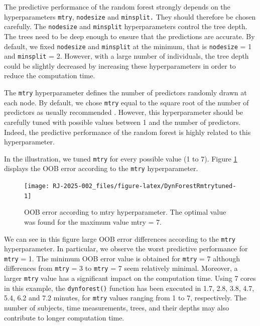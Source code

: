 The predictive performance of the random forest strongly depends on the hyperparameters \texttt{mtry}, \texttt{nodesize} and \texttt{minsplit.} They should therefore be chosen carefully. The \texttt{nodesize} and \texttt{minsplit} hyperparameters control the tree depth. The trees need to be deep enough to ensure that the predictions are accurate. By default, we fixed \texttt{nodesize} and \texttt{minsplit} at the minimum, that is \texttt{nodesize} = 1 and \texttt{minsplit} = 2. However, with a large number of individuals, the tree depth could be slightly decreased by increasing these hyperparameters in order to reduce the computation time.

The \texttt{mtry} hyperparameter defines the number of predictors randomly drawn at each node. By default, we chose \texttt{mtry} equal to the square root of the number of predictors as usually recommended \citep{bernard_influence_2009}. However, this hyperparameter should be carefully tuned with possible values between 1 and the number of predictors. Indeed, the predictive performance of the random forest is highly related to this hyperparameter.

In the illustration, we tuned \texttt{mtry} for every possible value (1 to 7). Figure \ref{fig:DynForestRmtrytuned} displays the OOB error according to the \texttt{mtry} hyperparameter.

\begin{figure}

{\centering \texttt{[image: RJ-2025-002\_files/figure-latex/DynForestRmtrytuned-1]} 

}

\caption{OOB error according to mtry hyperparameter. The optimal value was found for the maximum value mtry = 7.}\label{fig:DynForestRmtrytuned}
\end{figure}

We can see in this figure large OOB error differences according to the \texttt{mtry} hyperparameter. In particular, we observe the worst predictive performance for \texttt{mtry} = 1. The minimum OOB error value is obtained for \texttt{mtry} = 7 although differences from \texttt{mtry} = 3 to \texttt{mtry} = 7 seem relatively minimal. Moreover, a larger \texttt{mtry} value has a significant impact on the computation time. Using 7 cores in this example, the \texttt{dynforest()} function has been executed in 1.7, 2.8, 3.8, 4.7, 5.4, 6.2 and 7.2 minutes, for \texttt{mtry} values ranging from 1 to 7, respectively. The number of subjects, time measurements, trees, and their depths may also contribute to longer computation time.

